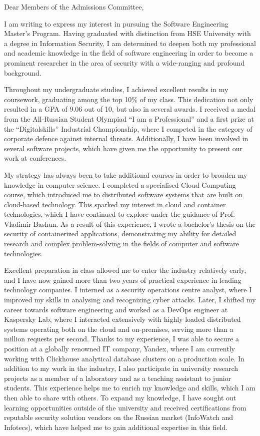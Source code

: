 \documentclass[12pt]{letter}
\begin{document}
\signature{Aleksei Shadrunov}

\begin{letter}{}
\opening{Dear Members of the Admissions Committee,}

I am writing to express my interest in pursuing the Software Engineering Master's Program. Having graduated with distinction from HSE University with a degree in Information Security, I am determined to deepen both my professional and academic knowledge in the field of software engineering in order to become a prominent researcher in the area of security with a wide-ranging and profound background.

Throughout my undergraduate studies, I achieved excellent results in my coursework, graduating among the top 10\% of my class. This dedication not only resulted in a GPA of 9.06 out of 10, but also in several awards. I received a medal from the All-Russian Student Olympiad ``I am a Professional'' and a first prize at the ``Digitalskills'' Industrial Championship, where I competed in the category of corporate defence against internal threats. Additionally, I have been involved in several software projects, which have given me the opportunity to present our work at conferences.

My strategy has always been to take additional courses in order to broaden my knowledge in computer science. I completed a specialised Cloud Computing course, which introduced me to distributed software systems that are built on cloud-based technology. This sparked my interest in cloud and container technologies, which I have continued to explore under the guidance of Prof. Vladimir Bashun. As a result of this experience, I wrote a bachelor's thesis on the security of containerized applications, demonstrating my ability for detailed research and complex problem-solving in the fields of computer and software technologies.

Excellent preparation in class allowed me to enter the industry relatively early, and I have now gained more than two years of practical experience in leading technology companies. I interned as a security operations centre analyst, where I improved my skills in analysing and recognizing cyber attacks. Later, I shifted my career towards software engineering and worked as a DevOps engineer at Kaspersky Lab, where I interacted extensively with highly loaded distributed systems operating both on the cloud and on-premises, serving more than a million requests per second. Thanks to my experience, I was able to secure a position at a globally renowned IT company, Yandex, where I am currently working with Clickhouse analytical database clusters on a production scale.
In addition to my work in the industry, I also participate in university research projects as a member of a laboratory and as a teaching assistant to junior students. This experience helps me to enrich my knowledge and skills, which I am then able to share with others. To expand my knowledge, I have sought out learning opportunities outside of the university and received certifications from reputable security solution vendors on the Russian market (InfoWatch and Infotecs), which have helped me to gain additional expertise in this field.


\end{letter}
\end{document}
